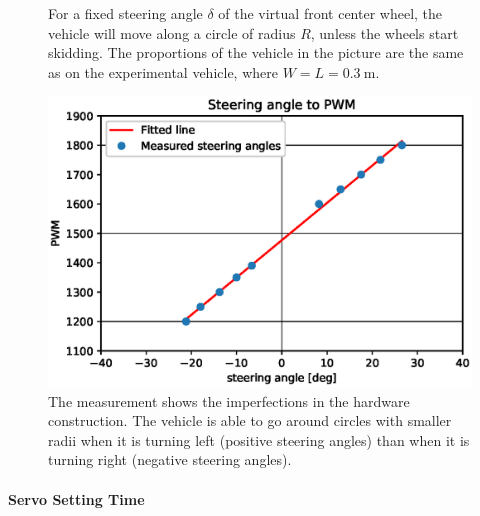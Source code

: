 \begin{figure}[ht]
	
	\caption{For a fixed steering angle $\delta$ of the virtual front center wheel, the vehicle will move along a circle of radius $R$, unless the wheels start skidding. The proportions of the vehicle in the picture are the same as on the experimental vehicle, where $W=L=\SI{0.3}{\meter}$.}
	\label{fig:steering_angle_radius_geometry}
\end{figure}

\begin{figure}[b]
	\includegraphics[width=\textwidth]{../img/steering_angle_to_pwm}
	\caption{The measurement shows the imperfections in the hardware construction. The vehicle is able to go around circles with smaller radii when it is turning left (positive steering angles) than when it is turning right (negative steering angles).}
	\label{fig:steering_angle_to_pwm}
\end{figure}

\paragraph{Servo Setting Time}

